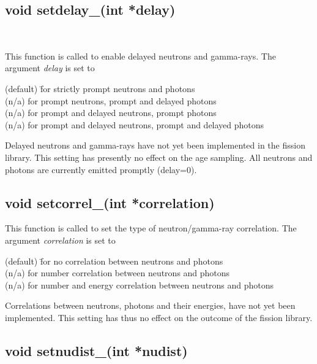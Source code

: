 \documentclass[fleqn,11pt]{article}
\begin{document}
\subsection{void setdelay\_(int *delay)}~\label{setdelay}

This function is called to enable delayed neutrons and 
gamma-rays. The argument \textit{delay} is set to 

\begin{tabbing}
 (default) \= for strictly prompt neutrons and photons \\
 (n/a) \> for prompt neutrons, prompt and delayed photons \\
 (n/a) \> for prompt and delayed neutrons, prompt photons \\
 (n/a) \> for prompt and delayed neutrons, prompt and delayed photons \\
\end{tabbing}

Delayed neutrons and gamma-rays have not yet been
implemented in the fission library. This setting
has presently no effect on the age sampling. All
neutrons and photons are currently emitted
promptly (delay=0).

\subsection{void setcorrel\_(int *correlation)}

This function is called to set the type of 
neutron/gamma-ray correlation.  The argument 
\textit{correlation} is set to

\begin{tabbing}
 (default) \= for no correlation between neutrons and photons \\
 (n/a) \> for number correlation between neutrons and photons \\
 (n/a) \> for number and energy correlation between neutrons and photons \\
\end{tabbing}

Correlations between neutrons, photons and their energies, 
have not yet been implemented. This setting has thus
no effect on the outcome of the fission library. 

\subsection{void setnudist\_(int *nudist)}~\label{setnudist}
\end{document}
